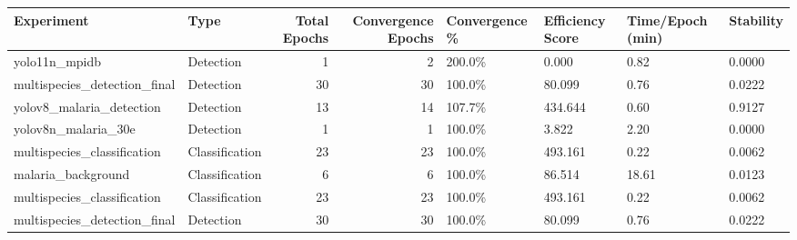 \begin{tabular}{llrrllll}
\toprule
                  Experiment &           Type &  Total Epochs &  Convergence Epochs & Convergence \% & Efficiency Score & Time/Epoch (min) & Stability \\
\midrule
               yolo11n\_mpidb &      Detection &             1 &                   2 &        200.0\% &            0.000 &             0.82 &    0.0000 \\
multispecies\_detection\_final &      Detection &            30 &                  30 &        100.0\% &           80.099 &             0.76 &    0.0222 \\
    yolov8\_malaria\_detection &      Detection &            13 &                  14 &        107.7\% &          434.644 &             0.60 &    0.9127 \\
         yolov8n\_malaria\_30e &      Detection &             1 &                   1 &        100.0\% &            3.822 &             2.20 &    0.0000 \\
 multispecies\_classification & Classification &            23 &                  23 &        100.0\% &          493.161 &             0.22 &    0.0062 \\
          malaria\_background & Classification &             6 &                   6 &        100.0\% &           86.514 &            18.61 &    0.0123 \\
 multispecies\_classification & Classification &            23 &                  23 &        100.0\% &          493.161 &             0.22 &    0.0062 \\
multispecies\_detection\_final &      Detection &            30 &                  30 &        100.0\% &           80.099 &             0.76 &    0.0222 \\
\bottomrule
\end{tabular}
